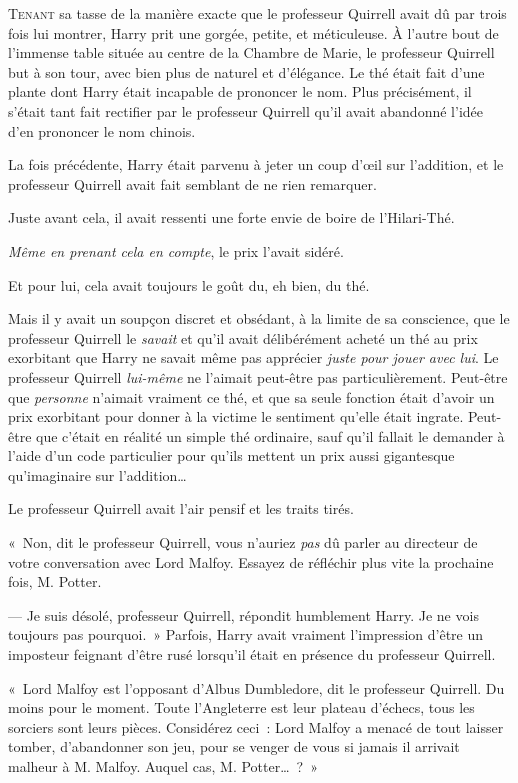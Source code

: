 
\lettrine{T}{enant} sa tasse de la manière exacte que le professeur Quirrell avait dû par trois fois lui montrer, Harry prit une gorgée, petite, et méticuleuse. À l'autre bout de l'immense table située au centre de la Chambre de Marie, le professeur Quirrell but à son tour, avec bien plus de naturel et d'élégance. Le thé était fait d'une plante dont Harry était incapable de prononcer le nom. Plus précisément, il s'était tant fait rectifier par le professeur Quirrell qu'il avait abandonné l'idée d'en prononcer le nom chinois.

La fois précédente, Harry était parvenu à jeter un coup d'œil sur l'addition, et le professeur Quirrell avait fait semblant de ne rien remarquer.

Juste avant cela, il avait ressenti une forte envie de boire de l'Hilari-Thé.

\emph{Même en prenant cela en compte}, le prix l'avait sidéré.

Et pour lui, cela avait toujours le goût du, eh bien, du thé.

Mais il y avait un soupçon discret et obsédant, à la limite de sa conscience, que le professeur Quirrell le \emph{savait} et qu'il avait délibérément acheté un thé au prix exorbitant que Harry ne savait même pas apprécier \emph{juste pour jouer avec lui}. Le professeur Quirrell \emph{lui-même} ne l'aimait peut-être pas particulièrement. Peut-être que \emph{personne} n'aimait vraiment ce thé, et que sa seule fonction était d'avoir un prix exorbitant pour donner à la victime le sentiment qu'elle était ingrate. Peut-être que c'était en réalité un simple thé ordinaire, sauf qu'il fallait le demander à l'aide d'un code particulier pour qu'ils mettent un prix aussi gigantesque qu'imaginaire sur l'addition…

Le professeur Quirrell avait l'air pensif et les traits tirés.

«~Non, dit le professeur Quirrell, vous n'auriez \emph{pas} dû parler au directeur de votre conversation avec Lord Malfoy. Essayez de réfléchir plus vite la prochaine fois, M. Potter.

--- Je suis désolé, professeur Quirrell, répondit humblement Harry. Je ne vois toujours pas pourquoi.~» Parfois, Harry avait vraiment l'impression d'être un imposteur feignant d'être rusé lorsqu'il était en présence du professeur Quirrell.

«~Lord Malfoy est l'opposant d'Albus Dumbledore, dit le professeur Quirrell. Du moins pour le moment. Toute l'Angleterre est leur plateau d'échecs, tous les sorciers sont leurs pièces. Considérez ceci~: Lord Malfoy a menacé de tout laisser tomber, d'abandonner son jeu, pour se venger de vous si jamais il arrivait malheur à M. Malfoy. Auquel cas, M. Potter…~?~»

